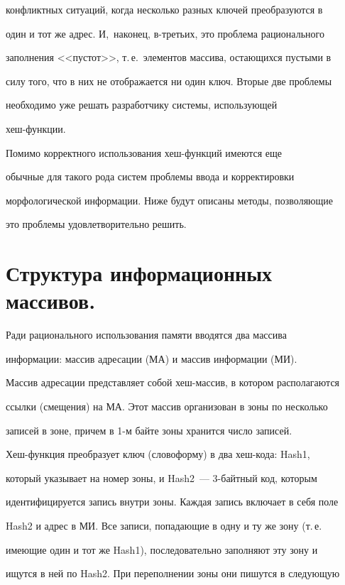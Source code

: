 конфликтных ситуаций, когда несколько разных ключей преобразуются в

один и тот же адрес. И,~наконец, в-третьих, это проблема рационального

заполнения <<пус\-тот>>, т.\,е.\ элементов массива, остающихся пустыми в

силу того, что в них не отображается ни один ключ. Вторые две проблемы

необходимо уже решать разработчику системы, использующей

    хеш-функ\-ции.



    Помимо корректного использования хеш-функ\-ций имеются еще

обычные для такого рода систем проблемы ввода и корректировки

морфологической информации. Ниже будут описаны методы, позволяющие

это проблемы удовлетворительно решить.



\section{Структура информационных массивов.}



    Ради рационального использования памяти вводятся два массива

информации: массив адресации (МА) и массив информации (МИ).



    Массив адресации представляет собой хеш-массив, в котором располагаются

ссылки (смещения) на МА. Этот массив организован в зоны по несколько

записей в зоне, причем в 1-м байте зоны хранится число записей.

    Хеш-функ\-ция преобразует ключ (словоформу) в два хеш-кода: Hash1,

который указывает на номер зоны, и Hash2~--- 3-байт\-ный код, которым

идентифицируется запись внутри зоны. Каждая запись включает в себя поле

Hash2 и адрес в МИ. Все записи, попадающие в одну и ту же зону (т.\,е.\

имеющие один и тот же Hash1), последовательно заполняют эту зону и

ищутся в ней по Hash2. При переполнении зоны они пишутся в следующую

